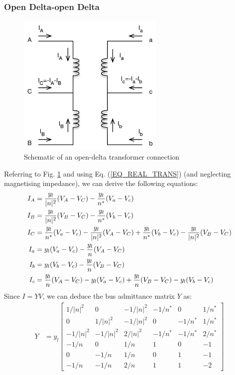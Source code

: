 \documentclass[11pt]{article}
\begin{document}
\subsubsection{Open Delta-open Delta}
\begin{figure}
\begin{center}
\includegraphics[width=7cm]{OpenDelta.png}
\caption{Schematic of an open-delta transformer connection}
\label{FIG_OPEN_DELTA}
\end{center}
\end{figure}
Referring to Fig. \ref{FIG_OPEN_DELTA} and using Eq. (\ref{EQ_REAL_TRANS}) (and neglecting magnetising impedance),  we can derive the following equations:
\newcommand{\maa}{\ensuremath{\frac{y_l}{|n|^2}}}
\newcommand{\mab}{\ensuremath{\frac{y_l}{n^*}}}
\newcommand{\mba}{\ensuremath{\frac{y_l}{n}}}
\newcommand{\mbb}{\ensuremath{y_l}}
\begin{align}
	I_A &= \maa(V_A - V_C) - \mab(V_a - V_c) \notag \\
	I_B &= \maa(V_B - V_C) - \mab(V_b - V_c) \notag \\
	I_C &= \mab(V_a - V_c) - \maa(V_A - V_C) + \mab(V_b - V_c) - \maa(V_B - V_C) \notag \\
	I_a &= \mbb(V_a - V_c) - \mba(V_A - V_C) \notag \\
	I_b &= \mbb(V_b - V_c) - \mba(V_B - V_C) \notag \\
	I_c &= \mba(V_A - V_C) - \mbb(V_a - V_c) + \mba(V_B - V_C) - \mbb(V_b - V_c)
\end{align}
Since $I = YV$, we can deduce the bus admittance matrix $Y$ as:
\renewcommand{\maa}[1]{\ensuremath{#1/|n|^2}}
\renewcommand{\mab}[1]{\ensuremath{#1/n^*}}
\renewcommand{\mba}[1]{\ensuremath{#1/n}}
\renewcommand{\mbb}[1]{\ensuremath{#1}}
\begin{align}
Y &= 
y_l\begin{bmatrix}
	\maa{1} & 0 & -\maa{1} & -\mab{1} & 0 & \mab{1} \\
	0 & \maa{1} & -\maa{1} & 0 & -\mab{1} & \mab{1} \\
	-\maa{1} & -\maa{1} & \maa{2} & -\mab{1} & -\mab{1} & \mab{2} \\
	-\mba{1} & 0 & \mba{1} & \mbb{1} & 0 & -\mbb{1} \\
	0 & -\mba{1} & \mba{1} & 0 & \mbb{1} & -\mbb{1} \\
	-\mba{1} & -\mba{1} & \mba{2} & \mbb{1} & \mbb{1} & -\mbb{2}
\end{bmatrix}
\end{align}
\end{document}
